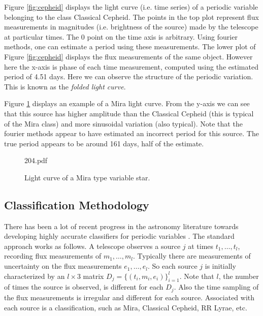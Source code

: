 \documentclass[11pt]{article}
\begin{document}
Figure \ref{fig:cepheid} displays the light curve (i.e. time series) of a periodic variable belonging to the class Classical Cepheid. The points in the top plot represent flux measurements in magnitudes (i.e. brightness of the source) made by the telescope at particular times. The 0 point on the time axis is arbitrary. Using fourier methods, one can estimate a period using these measurements.  The lower plot of Figure \ref{fig:cepheid} displays the flux measurements of the same object. However here the x-axis is phase of each time measurement, computed using the estimated period of 4.51 days. Here we can observe the structure of the periodic variation. This is known as the \textit{folded light curve}.

Figure \ref{fig:mira} displays an example of a Mira light curve. From the y-axis we can see that this source has higher amplitude than the Classical Cepheid (this is typical of the Mira class) and more sinusoidal variation (also typical). Note that the fourier methods appear to have estimated an incorrect period for this source. The true period appears to be around 161 days, half of the estimate.
\begin{figure}[h]
  \begin{center}
    \begin{includegraphics}[scale=.5]{204.pdf}
      \caption{Light curve of a Mira type variable star.\label{fig:mira}}
    \end{includegraphics}
  \end{center}
\end{figure}
\subsection{Classification Methodology}
There has been a lot of recent progress in the astronomy literature towards developing highly accurate classifiers for periodic variables \cite{debosscher2007automated,richards2011machine,dubath2011random}. The standard approach works as follows. A telescope observes a source $j$ at times $t_{1},\ldots,t_{l}$, recording flux measurements of $m_{1},\ldots,m_{l}$. Typically there are measurements of uncertainty on the flux measurements $e_{1},\ldots,e_{l}$. So each source $j$ is initially characterized by an $l \times 3$ matrix $D_j=\{(t_{i},m_{i},e_{i})\}_{i=1}^{l}$. Note that $l$, the number of times the source is observed, is different for each $D_j$. Also the time sampling of the flux measurements is irregular and different for each source. Associated with each source is a classification, such as Mira, Classical Cepheid, RR Lyrae, etc.
\end{document}
